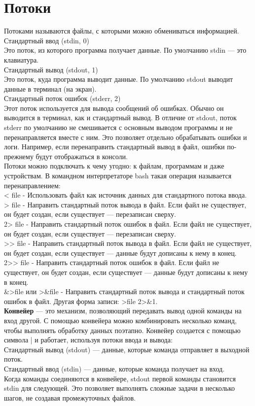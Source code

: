 \section{Потоки}
Потоками называются файлы, с которыми можно обмениваться информацией. \\
Стандартный ввод (stdin, 0) \\
Это поток, из которого программа получает данные. По умолчанию stdin — это клавиатура. \\
Стандартный вывод (stdout, 1) \\
Это поток, куда программа выводит данные. По умолчанию stdout выводит данные в терминал (на экран). \\
Стандартный поток ошибок (stderr, 2) \\
Этот поток используется для вывода сообщений об ошибках. Обычно он выводится в терминал, как и стандартный вывод. В отличие от stdout, поток stderr по умолчанию не смешивается с основным выводом программы и не перенаправляется вместе с ним. Это позволяет отдельно обрабатывать ошибки и логи. Например, если перенаправить стандартный вывод в файл, ошибки по-прежнему будут отображаться в консоли. \\
Потоки можно подключать к чему угодно: к файлам, программам и даже устройствам. В командном интерпретаторе bash такая операция называется перенаправлением: \\
< file - Использовать файл как источник данных для стандартного потока ввода. \\
> file - Направить стандартный поток вывода в файл. Если файл не существует, он будет создан, если существует — перезаписан сверху. \\
2> file - Направить стандартный поток ошибок в файл. Если файл не существует, он будет создан, если существует — перезаписан сверху. \\
>\!> file - Направить стандартный поток вывода в файл. Если файл не существует, он будет создан, если существует — данные будут дописаны к нему в конец. \\
2>\!> file - Направить стандартный поток ошибок в файл. Если файл не существует, он будет создан, если существует — данные будут дописаны к нему в конец. \\
\&>file или >\&file - Направить стандартный поток вывода и стандартный поток ошибок в файл. Другая форма записи: >file 2>\&1. \\
\textbf{Конвейер} — это механизм, позволяющий передавать вывод одной команды на вход другой. С помощью конвейера можно комбинировать несколько команд, чтобы выполнять обработку данных поэтапно. Конвейер создается с помощью символа | и работает, используя потоки ввода и вывода: \\
Стандартный вывод (stdout) — данные, которые команда отправляет в выходной поток. \\
Стандартный ввод (stdin) — данные, которые команда получает на вход. \\
Когда команды соединяются в конвейере, stdout первой команды становится stdin для следующей. Это позволяет выполнять сложные задачи в несколько шагов, не создавая промежуточных файлов. \\

